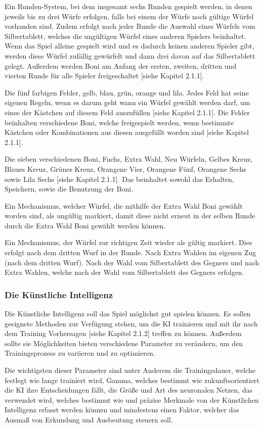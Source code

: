 Ein Runden-System, bei dem insgesamt sechs Runden gespielt werden, in denen jeweils bis zu drei Würfe erfolgen, falls bei einem der Würfe noch gültige Würfel vorhanden sind. Zudem erfolgt nach jeder Runde die Auswahl eines Würfels vom Silbertablett, welches die ungültigen Würfel eines anderen Spielers beinhaltet. Wenn das Spiel alleine gespielt wird und es dadurch keinen anderen Spieler gibt, werden diese Würfel zufällig gewürfelt und dann drei davon auf das Silbertablett gelegt. Außerdem werden Boni am Anfang der ersten, zweiten, dritten und vierten Runde für alle Spieler freigeschaltet [siehe Kapitel 2.1.1].

Die fünf farbigen Felder, gelb, blau, grün, orange und lila. Jedes Feld hat seine eigenen Regeln, wenn es darum geht wann ein Würfel gewählt werden darf, um eines der Kästchen auf diesem Feld auszufüllen [siehe Kapitel 2.1.1]. Die Felder beinhalten verschiedene Boni, welche freigespielt werden, wenn bestimmte Kästchen oder Kombinationen aus diesen ausgefüllt worden sind [siehe Kapitel 2.1.1].

Die sieben verschiedenen Boni, Fuchs, Extra Wahl, Neu Würfeln, Gelbes Kreuz, Blaues Kreuz, Grünes Kreuz, Orangene Vier, Orangene Fünf, Orangene Sechs sowie Lila Sechs [siehe Kapitel 2.1.1]. Das beinhaltet sowohl das Erhalten, Speichern, sowie die Benutzung der Boni.

Ein Mechanismus, welcher Würfel, die mithilfe der Extra Wahl Boni gewählt worden sind, als ungültig markiert, damit diese nicht erneut in der selben Runde durch die Extra Wahl Boni gewählt werden können.

Ein Mechanismus, der Würfel zur richtigen Zeit wieder als gültig markiert. Dies erfolgt nach dem dritten Wurf in der Runde. Nach Extra Wahlen im eigenen Zug (nach dem dritten Wurf). Nach der Wahl vom Silbertablett des Gegners und nach Extra Wahlen, welche nach der Wahl vom Silbertablett des Gegners erfolgen.
\subsubsection{Die Künstliche Intelligenz}
Die Künstliche Intelligenz soll das Spiel möglichst gut spielen können. Es sollen geeignete Methoden zur Verfügung stehen, um die KI trainieren und mit ihr nach dem Training Vorhersagen [siehe Kapitel 2.1.2] treffen zu können. Außerdem sollte sie Möglichkeiten bieten verschiedene Parameter zu verändern, um den Trainingsprozess zu variieren und zu optimieren. 

Die wichtigsten dieser Parameter sind unter Anderem die Trainingsdauer, welche festlegt wie lange trainiert wird, Gamma, welches bestimmt wie zukunftsorientiert die KI ihre Entscheidungen fällt, die Größe und Art des neuronalen Netzen, das verwendet wird, welches bestimmt wie und präzise Merkmale von der Künstlichen Intelligenz erfasst werden können und mindestens einen Faktor, welcher das Ausmaß von Erkundung und Ausbeutung steuern soll. 

